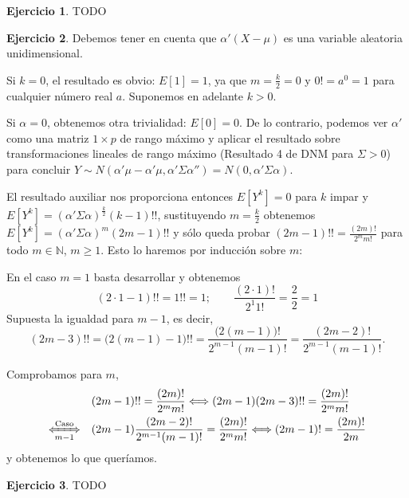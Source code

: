 \documentclass[12pt,spanish]{article}
\theoremstyle{definition}
\newtheorem{exercise}{Ejercicio}
\begin{document}
\begin{exercise} %
  TODO
\end{exercise}

\begin{exercise} %

  Debemos tener en cuenta que $\alpha'(X-\mu)$ es una variable
  aleatoria unidimensional.
  
  Si $k=0$, el resultado es obvio: $E[1]=1$, ya que $m=\frac{k}{2}=0$
  y $0!=a^0=1$ para cualquier número real $a$. Suponemos en adelante
  $k>0$.
  
  Si $\alpha=0$, obtenemos otra trivialidad: $E[0]=0$. De lo
  contrario, podemos ver $\alpha'$ como una matriz $1\times p$ de
  rango máximo y aplicar el resultado sobre transformaciones lineales
  de rango máximo (Resultado 4 de DNM para $\Sigma>0$) para concluir
  $Y\sim
  N(\alpha'\mu-\alpha'\mu,\alpha'\Sigma\alpha'')=N(0,\alpha'\Sigma\alpha)$.
  
  El resultado auxiliar nos proporciona entonces $E[Y^k]=0$ para $k$
  impar y \\ $E[Y^k]=(\alpha'\Sigma\alpha)^\frac{k}{2} (k-1)!!$,
  sustituyendo $m=\frac{k}{2}$ obtenemos
  $E[Y^k]=(\alpha'\Sigma\alpha)^m (2m-1)!!$ y sólo queda probar
  $(2m-1)!!=\frac{(2m)!}{2^m m!}$ para todo $m\in\mathbb{N}$,
  $m\geq 1$. Esto lo haremos por inducción sobre $m$:
  
  En el caso $m=1$ basta desarrollar y obtenemos
  \[(2\cdot 1-1)!!=1!!=1;\qquad \frac{(2\cdot 1)!}{2^1
      1!}=\frac{2}{2}=1\] Supuesta la igualdad para $m-1$, es decir,
  \[(2m-3)!!=\big(2(m-1)-1\big)!!=\frac{\big(2(m-1)\big)!}{2^{m-1} (m-1)!}=\frac{(2m-2)!}{2^{m-1} (m-1)!}.\]

  Comprobamos para $m$,
  \begin{align*}
    &(2m-1)!!=\frac{(2m)!}{2^m m!}
      \Longleftrightarrow (2m-1)(2m-3)!!=\frac{(2m)!}{2^m m!} \\
    \xLeftrightarrow[m-1]{\text{Caso}}\quad &(2m-1)\frac{(2m-2)!}{2^{m-1}(m-1)!}=\frac{(2m)!}{2^m m!} \Longleftrightarrow (2m-1)!=\frac{(2m)!}{2m}
  \end{align*}
  y obtenemos lo que queríamos.
  
\end{exercise}

\begin{exercise} %
  TODO
\end{exercise}
\end{document}
